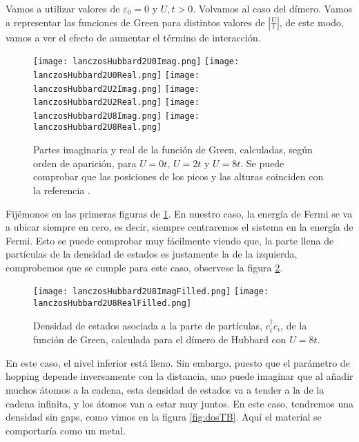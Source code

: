\documentclass[12pt,twoside]{article}
\begin{document}
Vamos a utilizar valores de $\varepsilon_0 = 0$ y $U, t > 0$. Volvamos al caso del dímero. Vamos a representar las funciones de Green para distintos valores de $\left|\frac{U}{t}\right|$, de este modo, vamos a ver el efecto de aumentar el término de interacción.
\begin{figure}[h!]
  \begin{center}
    \texttt{[image: lanczosHubbard2U0Imag.png]}
    \texttt{[image: lanczosHubbard2U0Real.png]}
    \texttt{[image: lanczosHubbard2U2Imag.png]}
    \texttt{[image: lanczosHubbard2U2Real.png]}
    \texttt{[image: lanczosHubbard2U8Imag.png]}
    \texttt{[image: lanczosHubbard2U8Real.png]}
  \end{center}
  \caption{Partes imaginaria y real de la función de Green, calculadas, según orden de aparición, para $U = 0t$, $U = 2t$ y $U = 8t$. Se puede comprobar que las posiciones de los picos y las alturas coinciden con la referencia \cite{GreeneDiniz2024}.}
  \label{fig:hubbardTransition}
\end{figure}

Fijémonos en las primeras figuras de \ref{fig:hubbardTransition}. En nuestro caso, la energía de Fermi se va a ubicar siempre en cero, es decir, siempre centraremos el sistema en la energía de Fermi. Esto se puede comprobar muy fácilmente viendo que, la parte llena de partículas de la densidad de estados es justamente la de la izquierda, comprobemos que se cumple para este caso, observese la figura \ref{fig:greenFilled}.
\begin{figure}[h!]
  \begin{center}
    \texttt{[image: lanczosHubbard2U8ImagFilled.png]}
    \texttt{[image: lanczosHubbard2U8RealFilled.png]}
  \end{center}
  \caption{Densidad de estados asociada a la parte de partículas, $c_i^{\dagger}c_i$, de la función de Green, calculada para el dímero de Hubbard con $U = 8t$.}
  \label{fig:greenFilled}
\end{figure}

En este caso, el nivel inferior está lleno. Sin embargo, puesto que el parámetro de hopping depende inversamente con la distancia, uno puede imaginar que al añadir muchos átomos a la cadena, esta densidad de estados va a tender a la de la cadena infinita, y los átomos van a estar muy juntos. En este caso, tendremos una densidad sin gaps, como vimos en la figura \ref{fig:dosTB}. Aquí el material se comportaría como un metal.
\end{document}
